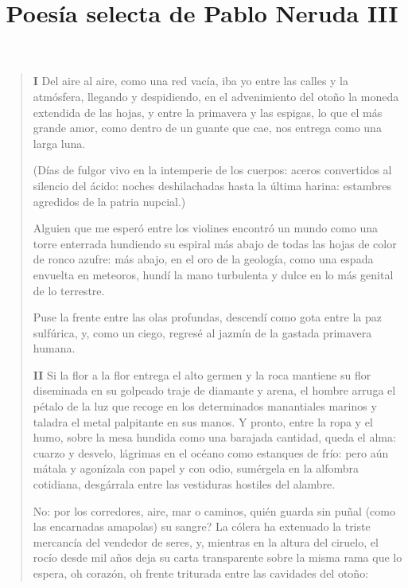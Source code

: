 \documentclass[12pt]{article}
\date{}
\title{Poesía selecta de Pablo Neruda III}
\begin{document}
\maketitle
\tableofcontents

\clearpage
{}
\begin{verse}
\vspace{\baselineskip}
{\scshape\bfseries I}
Del aire al aire, como una red vacía,  
iba yo entre las calles y la atmósfera, llegando y despidiendo,  
en el advenimiento del otoño la moneda extendida  
de las hojas, y entre la primavera y las espigas,  
lo que el más grande amor, como dentro de un guante  
que cae, nos entrega como una larga luna.  
	
(Días de fulgor vivo en la intemperie  
de los cuerpos: aceros convertidos  
al silencio del ácido:  
noches deshilachadas hasta la última harina:  
estambres agredidos de la patria nupcial.)  
	
Alguien que me esperó entre los violines  
encontró un mundo como una torre enterrada  
hundiendo su espiral más abajo de todas  
las hojas de color de ronco azufre:  
más abajo, en el oro de la geología,  
como una espada envuelta en meteoros,  
hundí la mano turbulenta y dulce  
en lo más genital de lo terrestre.  
	
Puse la frente entre las olas profundas,  
descendí como gota entre la paz sulfúrica,  
y, como un ciego, regresé al jazmín  
de la gastada primavera humana.  

\vspace{\baselineskip}
{\scshape\bfseries II}
Si la flor a la flor entrega el alto germen  
y la roca mantiene su flor diseminada  
en su golpeado traje de diamante y arena,  
el hombre arruga el pétalo de la luz que recoge  
en los determinados manantiales marinos  
y taladra el metal palpitante en sus manos.  
Y pronto, entre la ropa y el humo, sobre la mesa hundida  
como una barajada cantidad, queda el alma:  
cuarzo y desvelo, lágrimas en el océano  
como estanques de frío: pero aún  
mátala y agonízala con papel y con odio,  
sumérgela en la alfombra cotidiana, desgárrala  
entre las vestiduras hostiles del alambre.  
	
No: por los corredores, aire, mar o caminos,  
quién guarda sin puñal (como las encarnadas  
amapolas) su sangre? La cólera ha extenuado  
la triste mercancía del vendedor de seres,  
y, mientras en la altura del ciruelo, el rocío  
desde mil años deja su carta transparente  
sobre la misma rama que lo espera, oh corazón, oh frente triturada  
entre las cavidades del otoño:  
	

\end{verse}
\end{document}
